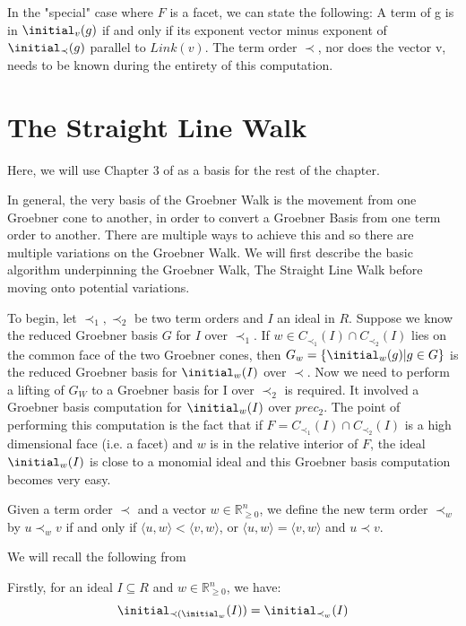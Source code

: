 \documentclass[12pt,a4paper]{report}
\begin{document}
In the "special" case where $F$ is a facet, we can state the following: A term of g is in $\initial_{v} (g)$ if and only if its exponent vector minus exponent of $\initial_{\prec} (g)$ parallel to $Link(v)$. The term order $\prec$, nor does the vector v, needs to be known during the entirety of this computation.


\section{The Straight Line Walk}
Here, we will use Chapter 3 of \cite{GenericGroebner} as a basis for the rest of the chapter.

In general, the very basis of the Groebner Walk is the movement from one Groebner cone to another, in order to convert a Groebner Basis from one term order to another. There are multiple ways to achieve this and so there are multiple variations on the Groebner Walk. We will first describe the basic algorithm underpinning the Groebner Walk, The Straight Line Walk before moving onto potential variations. 

To begin, let $\prec_{1}, \prec_{2}$ be two term orders and $I$ an ideal in $R$. Suppose we know the reduced Groebner basis $G$ for $I$ over $\prec_{1}$. If $w \in C_{\prec_{1}} (I) \cap C_{\prec_{2}} (I)$ lies on the common face of the two Groebner cones, then $G_{w} = \{ \initial_{w} (g) \vert g \in G \}$ is the reduced Groebner basis for $\initial_{w} (I)$ over $\prec$. Now we need to perform a lifting of $G_{W}$ to a Groebner basis for I over $\prec_{2}$ is required. It involved a Groebner basis computation for $\initial_{w} (I)$ over $prec_{2}$. The point of performing this computation is the fact that if $F = C_{\prec_{1}} (I) \cap C_{\prec_{2}} (I)$ is a high dimensional face (i.e. a facet) and $w$ is in the relative interior of $F$, the ideal $\initial_{w} (I)$ is close to a monomial ideal and this Groebner basis computation becomes very easy.

Given a term order $\prec$ and a vector $w \in \mathbb{R}^{n} _{\geq 0}$, we define the new term order $\prec_{w}$ by $u \prec_{w} v$ if and only if $\langle u, w \rangle < \langle v, w \rangle$, or $\langle u, w \rangle = \langle v, w \rangle$ and $u \prec v$.

We will recall the following from \cite{GenericGroebner}

Firstly, for an ideal $I \subseteq R$ and $w \in \mathbb{R}_{\geq 0}^{n}$, we have:
\begin{equation*}
    \initial_{{\prec} ( \initial_{w}} (I)) = \initial_{{\prec}_{w}} (I)
\end{equation*}
\end{document}

